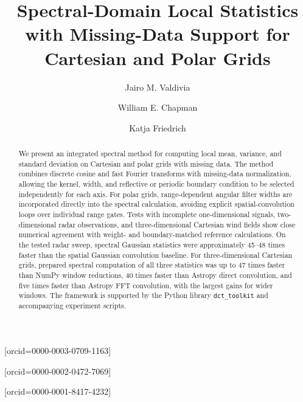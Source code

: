 \documentclass[a4paper,fleqn]{cas-sc}
\begin{document}
\let\WriteBookmarks\relax
\def\floatpagepagefraction{1}
\def\textpagefraction{.001}


\title[mode = title]{Spectral-Domain Local Statistics with Missing-Data Support for Cartesian and Polar Grids}
\tnotemark[1]

\author[1]{Jairo M. Valdivia}[orcid=0000-0003-0709-1163]
\cormark[1]

\author[1]{William E. Chapman}[orcid=0000-0002-0472-7069]

\author[1]{Katja Friedrich}[orcid=0000-0001-8417-4232]



\begin{abstract}
We present an integrated spectral method for computing local mean, variance, and standard deviation on Cartesian and polar grids with missing data. The method combines discrete cosine and fast Fourier transforms with missing-data normalization, allowing the kernel, width, and reflective or periodic boundary condition to be selected independently for each axis. For polar grids, range-dependent angular filter widths are incorporated directly into the spectral calculation, avoiding explicit spatial-convolution loops over individual range gates. Tests with incomplete one-dimensional signals, two-dimensional radar observations, and three-dimensional Cartesian wind fields show close numerical agreement with weight- and boundary-matched reference calculations. On the tested radar sweep, spectral Gaussian statistics were approximately 45--48 times faster than the spatial Gaussian convolution baseline. For three-dimensional Cartesian grids, prepared spectral computation of all three statistics was up to 47 times faster than NumPy window reductions, 40 times faster than Astropy direct convolution, and five times faster than Astropy FFT convolution, with the largest gains for wider windows. The framework is supported by the Python library \texttt{dct\_toolkit} and accompanying experiment scripts.
\end{abstract}
\end{document}
